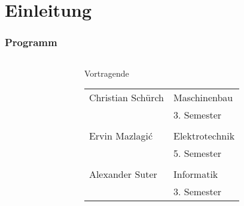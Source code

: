 \section{Einleitung}

\author{Ervin Mazlagi\'c}

\begin{frame}
	\frametitle{Programm\hfill{}\footnotesize \group}
	\begin{columns}
		\begin{column}{0.4\textwidth}
			\tableofcontents[hideallsubsections]
		\end{column}
		\begin{column}{0.6\textwidth}
			\begin{block}{Vortragende}
				\begin{tabular}{l l}
					Christian Schürch
						& Maschinenbau \\
						& 3. Semester \\
					& \\
					Ervin Mazlagi\'c
						& Elektrotechnik \\
						& 5. Semester \\
					& \\
					Alexander Suter
						& Informatik \\
						& 3. Semester \\
				\end{tabular}
			\end{block}
		\end{column}
	\end{columns}
\end{frame}
